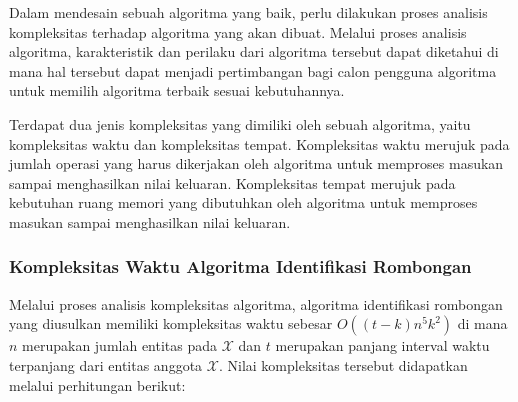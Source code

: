 Dalam mendesain sebuah algoritma yang baik, perlu dilakukan proses analisis kompleksitas terhadap algoritma yang akan dibuat. Melalui proses analisis algoritma, karakteristik dan perilaku dari algoritma tersebut dapat diketahui di mana hal tersebut dapat menjadi pertimbangan bagi calon pengguna algoritma untuk memilih algoritma terbaik sesuai kebutuhannya.

Terdapat dua jenis kompleksitas yang dimiliki oleh sebuah algoritma, yaitu kompleksitas waktu dan kompleksitas tempat. Kompleksitas waktu merujuk pada jumlah operasi yang harus dikerjakan oleh algoritma untuk memproses masukan sampai menghasilkan nilai keluaran. Kompleksitas tempat merujuk pada kebutuhan ruang memori yang dibutuhkan oleh algoritma untuk memproses masukan sampai menghasilkan nilai keluaran.

\subsubsection{Kompleksitas Waktu Algoritma Identifikasi Rombongan}
\label{subsubsec:time-complexity}

Melalui proses analisis kompleksitas algoritma, algoritma identifikasi rombongan yang diusulkan memiliki kompleksitas waktu sebesar $O((t - k)n^5k^2)$ di mana $n$ merupakan jumlah entitas pada $\mathcal{X}$ dan $t$ merupakan panjang interval waktu terpanjang dari entitas anggota $\mathcal{X}$. Nilai kompleksitas tersebut didapatkan melalui perhitungan berikut:

